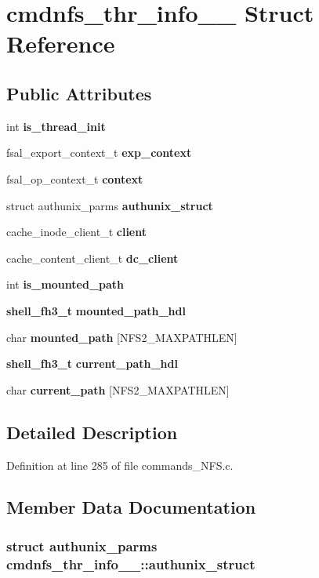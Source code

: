 \section{cmdnfs\_\-thr\_\-info\_\-\_\- Struct Reference}
\label{structcmdnfs__thr__info____}
\subsection*{Public Attributes}
\begin{CompactItemize}
\item 
int {\bf is\_\-thread\_\-init}
\item 
fsal\_\-export\_\-context\_\-t {\bf exp\_\-context}
\item 
fsal\_\-op\_\-context\_\-t {\bf context}
\item 
struct authunix\_\-parms {\bf authunix\_\-struct}
\item 
cache\_\-inode\_\-client\_\-t {\bf client}
\item 
cache\_\-content\_\-client\_\-t {\bf dc\_\-client}
\item 
int {\bf is\_\-mounted\_\-path}
\item 
{\bf shell\_\-fh3\_\-t} {\bf mounted\_\-path\_\-hdl}
\item 
char {\bf mounted\_\-path} [NFS2\_\-MAXPATHLEN]
\item 
{\bf shell\_\-fh3\_\-t} {\bf current\_\-path\_\-hdl}
\item 
char {\bf current\_\-path} [NFS2\_\-MAXPATHLEN]
\end{CompactItemize}


\subsection{Detailed Description}


Definition at line 285 of file commands\_\-NFS.c.

\subsection{Member Data Documentation}
\subsubsection[{authunix\_\-struct}]{\setlength{\rightskip}{0pt plus 5cm}struct authunix\_\-parms {\bf cmdnfs\_\-thr\_\-info\_\-\_\-::authunix\_\-struct}\hspace{0.3cm}{\tt  [read]}}\label{structcmdnfs__thr__info_____d38bb32013c0cfbfb38ea1a09beb1607}




